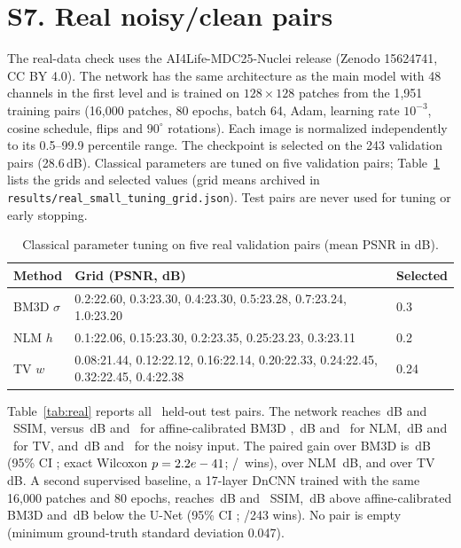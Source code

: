 \documentclass[11pt]{article}
\begin{document}
\section*{S7. Real noisy/clean pairs}
The real-data check uses the AI4Life-MDC25-Nuclei release
(Zenodo 15624741, CC BY 4.0). The network has the same architecture as the main
model with 48 channels in the first level and is trained on $128\times128$
patches from the 1{,}951 training pairs (16{,}000 patches, 80 epochs, batch
64, Adam, learning rate $10^{-3}$, cosine schedule, flips and $90^\circ$
rotations). Each image is normalized independently to its 0.5--99.9 percentile
range. The checkpoint is selected on the 243 validation pairs (28.6\,dB). Classical parameters are tuned on five
validation pairs; Table~\ref{tab:realtune} lists the grids and selected values
(grid means archived in \texttt{results/real\_small\_tuning\_grid.json}).
Test pairs are never used for tuning or early stopping.

\begin{table}[h]
\centering
\caption{Classical parameter tuning on five real validation pairs (mean PSNR
in dB).}
\label{tab:realtune}
\small
\begin{tabular}{lll}
\toprule
Method & Grid (PSNR, dB) & Selected \\
\midrule
BM3D $\sigma$ & 0.2:22.60, 0.3:23.30, 0.4:23.30, 0.5:23.28, 0.7:23.24, 1.0:23.20 & 0.3 \\
NLM $h$ & 0.1:22.06, 0.15:23.30, 0.2:23.35, 0.25:23.23, 0.3:23.11 & 0.2 \\
TV $w$ & 0.08:21.44, 0.12:22.12, 0.16:22.14, 0.20:22.33, 0.24:22.45, 0.32:22.45, 0.4:22.38 & 0.24 \\
\bottomrule
\end{tabular}
\end{table}

Table~\ref{tab:real} reports all \RealN\ held-out test pairs. The network
reaches \RealUnetP\,dB and \RealUnetS\ SSIM, versus \RealBMThreeP\,dB and
\RealBMThreeS\ for affine-calibrated BM3D \cite{dabov2007}, \RealNlmP\,dB and \RealNlmS\ for
NLM, \RealTvP\,dB and \RealTvS\ for TV, and \RealNoisyP\,dB and \RealNoisyS\
for the noisy input. The paired gain over BM3D is \RealGain\,dB (95\% CI
\RealCI; exact Wilcoxon $p=2.2e-41$; \RealWins/\RealN\ wins), over NLM
\RealGainNlm\,dB, and over TV \RealGainTv\,dB. A second supervised baseline, a
17-layer DnCNN trained with the same 16{,}000 patches and 80 epochs, reaches
\RealDncnnP\,dB and \RealDncnnS\ SSIM, \RealDncnnGain\,dB above affine-calibrated
BM3D and \RealUnetGainDncnn\,dB below the U-Net (95\% CI
\RealUnetDncnnCI; \RealUnetDncnnWins/243 wins). No pair is empty (minimum
ground-truth standard deviation 0.047).
\end{document}
